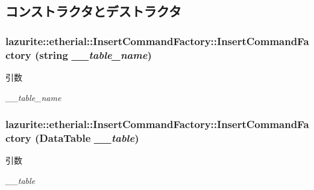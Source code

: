\subsection{コンストラクタとデストラクタ}
\hypertarget{classlazurite_1_1etherial_1_1_insert_command_factory_a681d2280ea017a412278b245a793411b}{
\subsubsection[{InsertCommandFactory}]{\setlength{\rightskip}{0pt plus 5cm}lazurite::etherial::InsertCommandFactory::InsertCommandFactory (string {\em \_\-\_\-table\_\-name})}}
\label{classlazurite_1_1etherial_1_1_insert_command_factory_a681d2280ea017a412278b245a793411b}

\begin{DoxyParams}{引数}
\item[{\em \_\-\_\-table\_\-name}]\end{DoxyParams}
\hypertarget{classlazurite_1_1etherial_1_1_insert_command_factory_abbb5bc3f37b1172a650e35350b53c7e6}{
\subsubsection[{InsertCommandFactory}]{\setlength{\rightskip}{0pt plus 5cm}lazurite::etherial::InsertCommandFactory::InsertCommandFactory (DataTable {\em \_\-\_\-table})}}
\label{classlazurite_1_1etherial_1_1_insert_command_factory_abbb5bc3f37b1172a650e35350b53c7e6}

\begin{DoxyParams}{引数}
\item[{\em \_\-\_\-table}]\end{DoxyParams}


